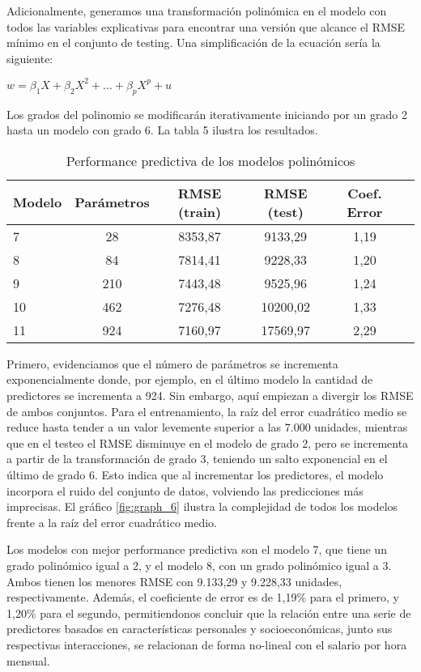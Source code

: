 \documentclass[11pt,oneside]{article}
\begin{document}
	Adicionalmente, generamos una transformación polinómica en el modelo con todos las variables explicativas para encontrar una versión que alcance el RMSE mínimo en el conjunto de testing. Una simplificación de la ecuación sería la siguiente:
	
	\begin{center}
		$w = \beta_{1}X + \beta_{2}X^2 + ... + \beta_{p}X^p + u$
	\end{center}
	
	Los grados del polinomio se modificarán iterativamente iniciando por un grado 2 hasta un modelo con grado 6. La tabla 5 ilustra los resultados.
	
	\begin{table}[H]
		\centering
        \caption{Performance predictiva de los modelos polinómicos}
		\begin{tabular}{lccccc}
			\hline
			\textbf{Modelo} & \textbf{Parámetros} & \textbf{RMSE (train)} & \textbf{RMSE (test)} & \textbf{Coef. Error} \\ \hline
			7  & 28  & 8353,87  & 9133,29  & 1,19 \\ 
			8  & 84  & 7814,41  & 9228,33  & 1,20 \\ 
			9  & 210 & 7443,48  & 9525,96  & 1,24 \\ 
			10 & 462 & 7276,48  & 10200,02 & 1,33 \\ 
			11 & 924 & 7160,97  & 17569,97 & 2,29 \\ \hline
		\end{tabular}
		\label{tab:modelos_rmse}
	\end{table}
	
	Primero, evidenciamos que el número de parámetros se incrementa exponencialmente donde, por ejemplo, en el último modelo la cantidad de predictores se incrementa a 924. Sin embargo, aquí empiezan a divergir los RMSE de ambos conjuntos. Para el entrenamiento, la raíz del error cuadrático medio se reduce hasta tender a un valor levemente superior a las 7.000 unidades, mientras que en el testeo el RMSE disminuye en el modelo de grado 2, pero se incrementa a partir de la transformación de grado 3, teniendo un salto exponencial en el último de grado 6. Esto indica que al incrementar los predictores, el modelo incorpora el ruido del conjunto de datos, volviendo las predicciones más imprecisas.  
	El gráfico \ref{fig:graph_6} ilustra la complejidad de todos los modelos frente a la raíz del error cuadrático medio. 
	
	
	Los modelos con mejor performance predictiva son el modelo 7, que tiene un grado polinómico igual a 2, y el modelo 8, con un grado polinómico igual a 3. Ambos tienen los menores RMSE con 9.133,29 y 9.228,33 unidades, respectivamente. Además, el coeficiente de error es de 1,19\% para el primero, y 1,20\% para el segundo, permitiendonos concluir que la relación entre una serie de predictores basados en características personales y socioeconómicas, junto sus respectivas interacciones, se relacionan de forma no-lineal con el salario por hora mensual. 
	
\end{document}
